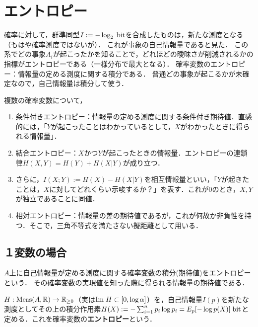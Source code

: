 \documentclass[uplatex,dvipdfmx]{jsreport}
\begin{document}
\section{エントロピー}

\begin{tcolorbox}[colframe=ForestGreen, colback=ForestGreen!10!white,breakable,colbacktitle=ForestGreen!40!white,coltitle=black,fonttitle=\bfseries\sffamily,
title=自己情報量の平均]
    確率に対して，群準同型$I:=-\log_2\;\mathrm{bit}$を合成したものは，新たな測度となる（もはや確率測度ではないが）．
    これが事象の自己情報量であると見た．
    この系でどの事象$A_i$が起こったかを知ることで，どれほどの曖昧さが削減されるかの指標がエントロピーである（一様分布で最大となる）．
    確率変数のエントロピー：情報量の定める測度に関する積分である．
    普通どの事象が起こるかが未確定なので，自己情報量は積分して使う．

    複数の確率変数について，
    \begin{enumerate}
        \item 条件付きエントロピー：情報量の定める測度に関する条件付き期待値．直感的には，「$Y$が起こったことはわかっているとして，$X$がわかったときに得られる情報量」．
        \item 結合エントロピー：$X$かつ$Y$が起こったときの情報量．エントロピーの連鎖律$H(X,Y)=H(Y)+H(X|Y)$が成り立つ．
        \item さらに，$I(X;Y):=H(X)-H(X|Y)$を相互情報量といい，「$Y$が起きたことは，$X$に対してどれくらい示唆するか？」を表す．これが$0$のとき，$X,Y$が独立であることに同値．
        \item 相対エントロピー：情報量の差の期待値であるが，これが何故か非負性を持つ．そこで，三角不等式を満たさない擬距離として用いる．
    \end{enumerate}
\end{tcolorbox}

\subsection{１変数の場合}

\begin{tcolorbox}[colframe=ForestGreen, colback=ForestGreen!10!white,breakable,colbacktitle=ForestGreen!40!white,coltitle=black,fonttitle=\bfseries\sffamily,
title=]
    $A$上に自己情報量が定める測度に関する確率変数の積分(期待値)をエントロピーという．
    その確率変数の実現値を知った際に得られる情報量の期待値である．
\end{tcolorbox}

\begin{definition}[entropy]
    $H:\mathrm{Meas}(A,\mathbb{R})\to\mathbb{R}_{\ge0}$（実は$\mathrm{Im}\; H\subset[0,\log\alpha]$）を，自己情報量$I(p)$を新たな測度としてその上の積分作用素$H(X):=-\sum_{i=1}^np_i\log p_i=E_p[-\log p(X)]\;\mathrm{bit}$と定める．これを確率変数の\textbf{エントロピー}という．
\end{definition}
\end{document}
